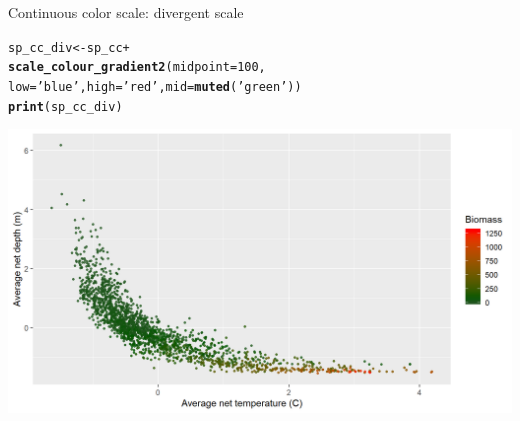 \documentclass{beamer}\usepackage[]{graphicx}\usepackage[]{color}
\makeatletter
\newcommand{\hlnum}[1]{\textcolor[rgb]{0.686,0.059,0.569}{#1}}%
\newcommand{\hlstr}[1]{\textcolor[rgb]{0.192,0.494,0.8}{#1}}%
\newcommand{\hlopt}[1]{\textcolor[rgb]{0,0,0}{#1}}%
\newcommand{\hlstd}[1]{\textcolor[rgb]{0.345,0.345,0.345}{#1}}%
\newcommand{\hlkwb}[1]{\textcolor[rgb]{0.69,0.353,0.396}{#1}}%
\newcommand{\hlkwc}[1]{\textcolor[rgb]{0.333,0.667,0.333}{#1}}%
\newcommand{\hlkwd}[1]{\textcolor[rgb]{0.737,0.353,0.396}{\textbf{#1}}}%
\newenvironment{kframe}{%
 \def\at@end@of@kframe{}%
 \ifinner\ifhmode%
  \def\at@end@of@kframe{\end{minipage}}%
  \begin{minipage}{\columnwidth}%
 \fi\fi%
 \def\FrameCommand##1{\hskip\@totalleftmargin \hskip-\fboxsep
 \colorbox{shadecolor}{##1}\hskip-\fboxsep
     \hskip-\linewidth \hskip-\@totalleftmargin \hskip\columnwidth}%
 \MakeFramed {\advance\hsize-\width
   \@totalleftmargin\z@ \linewidth\hsize
   \@setminipage}}%
 {\par\unskip\endMakeFramed%
 \at@end@of@kframe}
\newenvironment{knitrout}{}{} %
\makeatother
\begin{document}
\begin{frame}[fragile]{Continuous color scale: divergent scale}
\begin{knitrout}\footnotesize
{}\color{fgcolor}\begin{kframe}
\begin{alltt}
\hlstd{sp_cc_div} \hlkwb{<-} \hlstd{sp_cc} \hlopt{+}
  \hlkwd{scale_colour_gradient2}\hlstd{(}\hlkwc{midpoint} \hlstd{=} \hlnum{100}\hlstd{,}
                         \hlkwc{low} \hlstd{=} \hlstr{'blue'}\hlstd{,} \hlkwc{high} \hlstd{=} \hlstr{'red'}\hlstd{,} \hlkwc{mid} \hlstd{=} \hlkwd{muted}\hlstd{(}\hlstr{'green'}\hlstd{))}
\hlkwd{print}\hlstd{(sp_cc_div)}
\end{alltt}
\end{kframe}

{\centering \includegraphics[width=.9\linewidth]{figure/sp_continuous_color3-1} 

}



\end{knitrout}
\end{frame}
\end{document}
